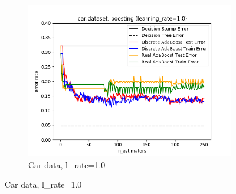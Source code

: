 \documentclass{article}
\begin{document}
\begin{figure}[htb]
\begin{subfigure}{0.33\textwidth}
      \includegraphics[width=\linewidth]{out/boosting/car-error-lrate-1.0.png}
      \caption{Car data, l\_rate=1.0}
      \label{fig:boosting-param-3}
    \end{subfigure}

    \medskip


\end{figure}
\end{document}
